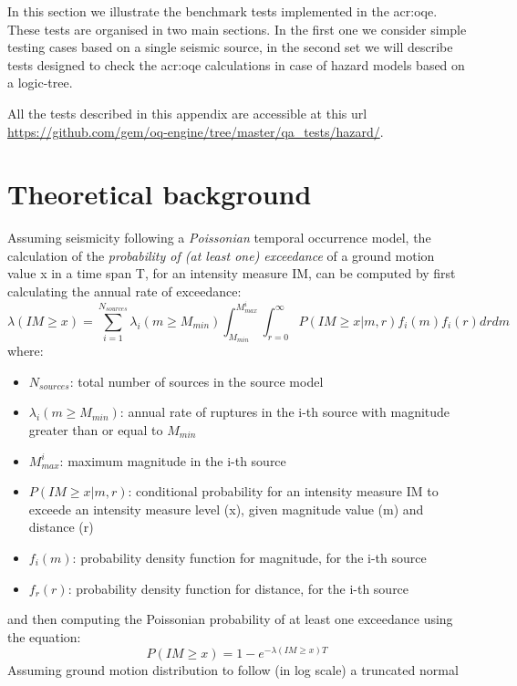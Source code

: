In this section we illustrate the benchmark tests implemented in the 
\gls{acr:oqe}. These tests are organised in two main sections. In the 
first one we consider simple testing cases based on a single seismic 
source, in the second set we will describe tests designed to check 
the \gls{acr:oqe} calculations in case of hazard models based on a 
logic-tree. 

All the tests described in this appendix are accessible at this
url \url{https://github.com/gem/oq-engine/tree/master/qa_tests/hazard/}.
%
\section{Theoretical background}
Assuming seismicity following a \textit{Poissonian} temporal occurrence model,
the calculation of the \textit{probability of (at least one) exceedance} of a
ground motion value x in a time span T, for an intensity measure IM, can be
computed by first calculating the annual rate of exceedance:
\begin{equation}
    \label{are}
    \lambda(IM \geq x) = \sum_{i=1}^{N_{sources}} \lambda_{i}(m\geq M_{min})
    \int_{M_{min}}^{M_{max}^{i}} \int_{r=0}^{\infty}
    P(IM\geq x | m,r)
    f_{i}(m)
    f_{i}(r)
    drdm
\end{equation}
where:
\begin{itemize}
\item $N_{sources}$: total number of sources in the source model
\item $\lambda_{i}(m\geq M_{min})$: annual rate of ruptures in the i-th source with magnitude greater than or equal to $M_{min}$
\item $M_{max}^{i}$: maximum magnitude in the i-th source
\item $P(IM\geq x | m,r)$: conditional probability for an intensity measure IM to exceede an intensity measure level (x), given magnitude
value (m) and distance (r)
\item $f_{i}(m)$: probability density function for magnitude, for the i-th source
\item $f_{r}(r)$: probability density function for distance, for the i-th source
\end{itemize}
and then computing the Poissonian probability of at least one exceedance using the equation:
\begin{equation}
    \label{poe}
    P(IM \geq x) = 1-e^{-\lambda(IM\geq x) T}
\end{equation}
Assuming ground motion distribution to follow (in log scale) a truncated normal 
